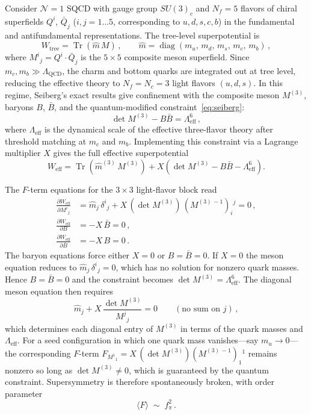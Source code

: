 \documentclass[12pt,a4paper]{article}
\newcommand{\fpi}{f_\pi}
\begin{document}
Consider $\mathcal{N}=1$ SQCD with gauge group $SU(3)_c$ and $N_f=5$ flavors
of chiral superfields $Q^i$, $\bar Q_j$ ($i,j=1\ldots 5$, corresponding to
$u,d,s,c,b$) in the fundamental and antifundamental representations. The
tree-level superpotential is
%
\begin{equation*}
  W_{\text{tree}} = \operatorname{Tr}(\hat m\, M)\,,
  \qquad
  \hat m = \operatorname{diag}(m_u,\, m_d,\, m_s,\, m_c,\, m_b)\,,
\end{equation*}
%
where $M^i{}_j = Q^i\cdot\bar Q_j$ is the $5\times 5$ composite meson
superfield. Since $m_c, m_b \gg \Lambda_{\text{QCD}}$, the charm and
bottom quarks are integrated out at tree level, reducing the effective
theory to $N_f = N_c = 3$ light flavors $(u,d,s)$. In this regime,
Seiberg's exact results give confinement with the composite meson
$M^{(3)}$, baryons $B$, $\bar B$, and the quantum-modified
constraint~\eqref{eq:seiberg}:
%
\begin{equation*}
  \det M^{(3)} - B\bar B = \Lambda_{\text{eff}}^{6}\,,
\end{equation*}
%
where $\Lambda_{\text{eff}}$ is the dynamical scale of the effective
three-flavor theory after threshold matching at $m_c$ and $m_b$.
Implementing this constraint via a Lagrange multiplier $X$ gives the full
effective superpotential
%
\begin{equation*}
  W_{\text{eff}}
  = \operatorname{Tr}(\hat m^{(3)}\, M^{(3)})
  + X\!\left(\det M^{(3)} - B\bar B - \Lambda_{\text{eff}}^{6}\right).
\end{equation*}

The $F$-term equations for the $3\times 3$ light-flavor block read
%
\begin{align*}
  \frac{\partial W_{\text{eff}}}{\partial M^i{}_j}
  &= \hat m_j\,\delta^i{}_j
    + X\,(\det M^{(3)})\,(M^{(3)\,-1})_i{}^j = 0\,,\\[4pt]
  \frac{\partial W_{\text{eff}}}{\partial B}
  &= -X\,\bar B = 0\,,\\[4pt]
  \frac{\partial W_{\text{eff}}}{\partial \bar B}
  &= -X\, B = 0\,.
\end{align*}
%
The baryon equations force either $X=0$ or $B=\bar B=0$. If $X=0$ the meson
equation reduces to $\hat m_j\,\delta^i{}_j=0$, which has no solution for
nonzero quark masses. Hence $B=\bar B=0$ and the constraint becomes
$\det M^{(3)} = \Lambda_{\text{eff}}^6$. The diagonal meson equation then requires
%
\begin{equation*}
  \hat m_j + X\,\frac{\det M^{(3)}}{M^j{}_j} = 0
  \qquad(\text{no sum on } j)\,,
\end{equation*}
%
which determines each diagonal entry of $M^{(3)}$ in terms of the quark masses and
$\Lambda_{\text{eff}}$. For a seed configuration in which one quark mass vanishes---say
$m_u\to 0$---the corresponding $F$-term
$F_{M^1{}_1}=X\,(\det M^{(3)})(M^{(3)\,-1})_1{}^1$ remains nonzero so long as
$\det M^{(3)}\neq 0$, which is guaranteed by the quantum constraint. Supersymmetry
is therefore spontaneously broken, with order parameter
%
\begin{equation*}
  \langle F \rangle \;\sim\; \fpi^2\,.
\end{equation*}
\end{document}
